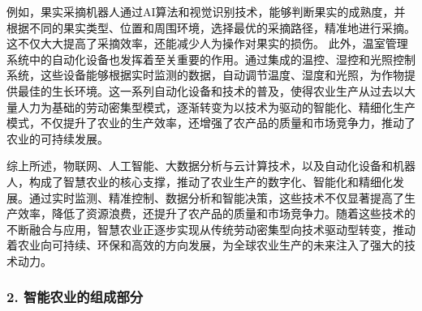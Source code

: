 \begin{enumerate}[(1)]
    例如，果实采摘机器人通过AI算法和视觉识别技术，能够判断果实的成熟度，并根据不同的果实类型、位置和周围环境，选择最优的采摘路径，精准地进行采摘。这不仅大大提高了采摘效率，还能减少人为操作对果实的损伤。 此外，温室管理系统中的自动化设备也发挥着至关重要的作用。通过集成的温控、湿控和光照控制系统，这些设备能够根据实时监测的数据，自动调节温度、湿度和光照，为作物提供最佳的生长环境。这一系列自动化设备和技术的普及，使得农业生产从过去以大量人力为基础的劳动密集型模式，逐渐转变为以技术为驱动的智能化、精细化生产模式，不仅提升了农业的生产效率，还增强了农产品的质量和市场竞争力，推动了农业的可持续发展。
\end{enumerate} 

综上所述，物联网、人工智能、大数据分析与云计算技术，以及自动化设备和机器人，构成了智慧农业的核心支撑，推动了农业生产的数字化、智能化和精细化发展。通过实时监测、精准控制、数据分析和智能决策，这些技术不仅显著提高了生产效率，降低了资源浪费，还提升了农产品的质量和市场竞争力。随着这些技术的不断融合与应用，智慧农业正逐步实现从传统劳动密集型向技术驱动型转变，推动着农业向可持续、环保和高效的方向发展，为全球农业生产的未来注入了强大的技术动力。 




\subsubsection{2. 智能农业的组成部分}

